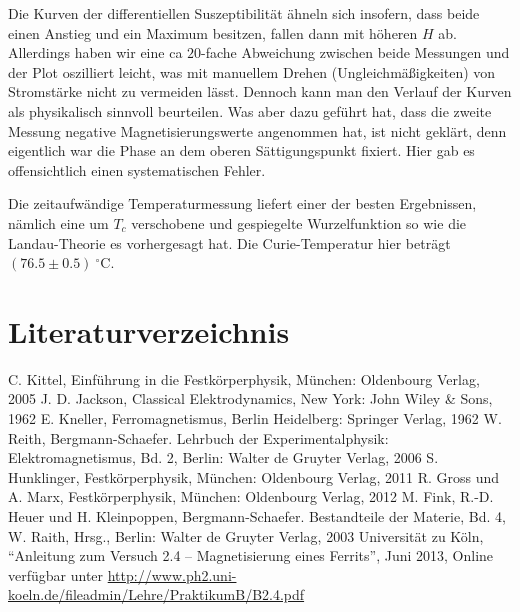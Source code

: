 \documentclass[12pt,a4paper]{scrartcl}
\numberwithin{equation}{section} %
\renewcommand{\[}{} %
\renewcommand{\]}{\noindent} %
\begin{document}
Die Kurven der differentiellen Suszeptibilität ähneln sich insofern, dass beide einen Anstieg und ein Maximum besitzen, fallen dann mit höheren \(H\) ab. Allerdings haben wir eine ca \(20\)-fache Abweichung zwischen beide Messungen und der Plot oszilliert leicht, was mit manuellem Drehen (Ungleichmäßigkeiten) von Stromstärke nicht zu vermeiden lässt. Dennoch kann man den Verlauf der Kurven als physikalisch sinnvoll beurteilen. Was aber dazu geführt hat, dass die zweite Messung negative Magnetisierungswerte angenommen hat, ist nicht geklärt, denn eigentlich war die Phase an dem oberen Sättigungspunkt fixiert. Hier gab es offensichtlich einen systematischen Fehler.

Die zeitaufwändige Temperaturmessung liefert einer der besten Ergebnissen, nämlich eine um \(T_{c}\) verschobene und gespiegelte Wurzelfunktion so wie die Landau-Theorie es vorhergesagt hat. Die Curie-Temperatur hier beträgt \((76.5 \pm 0.5) \ ^\circ\mathrm C\).

\hypertarget{literaturverzeichnis}{%
\section{Literaturverzeichnis}\label{literaturverzeichnis}}
\begin{thebibliography}{9}
		C. Kittel, Einführung in die Festkörperphysik, München: Oldenbourg Verlag, 2005
		J. D. Jackson, Classical Elektrodynamics, New York: John Wiley \& Sons, 1962
		E. Kneller, Ferromagnetismus, Berlin Heidelberg: Springer Verlag, 1962
		W. Reith, Bergmann-Schaefer. Lehrbuch der Experimentalphysik: Elektromagnetismus, Bd. 2, Berlin: Walter de Gruyter Verlag, 2006
		S. Hunklinger, Festkörperphysik, München: Oldenbourg Verlag, 2011
		R. Gross und A. Marx, Festkörperphysik, München: Oldenbourg Verlag, 2012
		M. Fink, R.-D. Heuer und H. Kleinpoppen, Bergmann-Schaefer. Bestandteile der Materie, Bd. 4, W. Raith, Hrsg., Berlin: Walter de Gruyter Verlag, 2003
		Universität zu Köln, ``Anleitung zum Versuch 2.4 -- Magnetisierung eines Ferrits'', Juni 2013, Online verfügbar unter \url{http://www.ph2.uni-koeln.de/fileadmin/Lehre/PraktikumB/B2.4.pdf}
\end{thebibliography}
\end{document}
